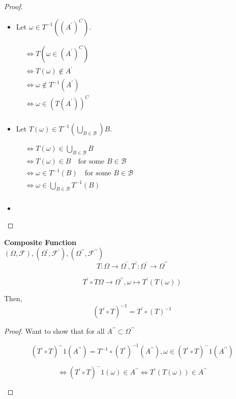\documentclass[11pt,fleqn]{book} %
\begin{document}
\begin{proof}
	\begin{itemize}
		\item Let $\omega \in T^{-1}((A^\prime)^C)$. 

				$\begin{aligned}
						& \Leftrightarrow T(\omega \in (A^\prime)^C)\\
						& \Leftrightarrow T(\omega) \notin  A^\prime \\
						& \Leftrightarrow \omega \notin T^{-1}(A^\prime)\\
						& \Leftrightarrow \omega \in (T(A^\prime))^C\\
				\end{aligned}$

		\item Let $T(\omega) \in T^{-1}(\bigcup_{B \in \mathcal{B}}) B$. 

				$\begin{aligned}
						& \Leftrightarrow T(\omega) \in \bigcup_{B \in \mathcal{B}} B\\
						& \Leftrightarrow T(\omega) \in  B \quad \text{for some } B \in \mathcal{B} \\
						& \Leftrightarrow \omega \in  T^{-1}(B) \quad \text{for some } B \in \mathcal{B} \\
						& \Leftrightarrow \omega \in \bigcup_{B \in \mathcal{B}} T^{-1}(B) \\
				\end{aligned}$	
		\item	
	\end{itemize}
\end{proof}


\textbf{Composite Function}\\

$(\Omega, \mathcal{F}), (\Omega^\prime, \mathcal{F}^\prime), (\Omega^{\prime \prime}, \mathcal{F}^{\prime \prime}) $\\

		$$T: \Omega \rightarrow \Omega^\prime, T^\prime: \Omega^\prime \rightarrow \Omega^{\prime \prime} $$

		$$T^\prime \circ T \Omega \rightarrow \Omega^{\prime \prime}, \omega \mapsto T^\prime(T(\omega)) $$

Then, 
		$$ (T^\prime \circ T)^{-1} = T^\prime \circ (T)^{-1} $$


\begin{proof}

Want to show that for all $A^{\prime\prime} \subset \Omega^{\prime\prime}$

	$$(T^\prime \circ T)^-1 (A^{\prime\prime}) = T^{-1} \circ (T^\prime)^{-1}(A^{\prime\prime}), \omega \in (T^\prime \circ T)^-1 (A^{\prime\prime}) $$

		$$\Leftrightarrow (T^\prime \circ T)^-1 (\omega) \in A^{\prime\prime} \Leftrightarrow T^\prime (T(\omega)) \in A^{\prime\prime} $$

		$$ $$


\end{proof}
\end{document}
